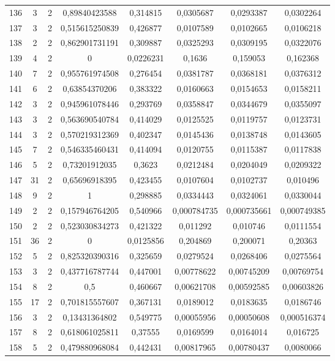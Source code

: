 \begin{longtable}{|c|c|c|c|c|c|c|c|}
136 & 3 & 2 & 0,89840423588 & 0,314815 & 0,0305687 & 0,0293387 & 0,0302264  \\
137 & 3 & 2 & 0,515615250839 & 0,426877 & 0,0107589 & 0,0102665 & 0,0106218  \\
138 & 2 & 2 & 0,862901731191 & 0,309887 & 0,0325293 & 0,0309195 & 0,0322076  \\
139 & 4 & 2 & 0 & 0,0226231 & 0,1636 & 0,159053 & 0,162368  \\
140 & 7 & 2 & 0,955761974508 & 0,276454 & 0,0381787 & 0,0368181 & 0,0376312  \\
141 & 6 & 2 & 0,63854370206 & 0,383322 & 0,0160663 & 0,0154653 & 0,0158211  \\
142 & 3 & 2 & 0,945961078446 & 0,293769 & 0,0358847 & 0,0344679 & 0,0355097  \\
143 & 3 & 2 & 0,563690540784 & 0,414029 & 0,0125525 & 0,0119757 & 0,0123731  \\
144 & 3 & 2 & 0,570219312369 & 0,402347 & 0,0145436 & 0,0138748 & 0,0143605  \\
145 & 7 & 2 & 0,546335460431 & 0,414094 & 0,0120755 & 0,0115387 & 0,0117838  \\
146 & 5 & 2 & 0,73201912035 & 0,3623 & 0,0212484 & 0,0204049 & 0,0209322  \\
147 & 31 & 2 & 0,65696918395 & 0,423455 & 0,0107604 & 0,0102737 & 0,010496  \\
148 & 9 & 2 & 1 & 0,298885 & 0,0334443 & 0,0324061 & 0,0330044  \\
149 & 2 & 2 & 0,157946764205 & 0,540966 & 0,000784735 & 0,000735661 & 0,000749385  \\
150 & 2 & 2 & 0,523030834273 & 0,421322 & 0,011292 & 0,010746 & 0,0111554  \\
151 & 36 & 2 & 0 & 0,0125856 & 0,204869 & 0,200071 & 0,20363  \\
152 & 5 & 2 & 0,825320390316 & 0,325659 & 0,0279524 & 0,0268406 & 0,0275564  \\
153 & 3 & 2 & 0,437716787744 & 0,447001 & 0,00778622 & 0,00745209 & 0,00769754  \\
154 & 8 & 2 & 0,5 & 0,460667 & 0,00621708 & 0,00592585 & 0,00603826  \\
155 & 17 & 2 & 0,701815557607 & 0,367131 & 0,0189012 & 0,0183635 & 0,0186746  \\
156 & 3 & 2 & 0,13431364802 & 0,549775 & 0,00055956 & 0,00050608 & 0,000516374  \\
157 & 8 & 2 & 0,618061025811 & 0,37555 & 0,0169599 & 0,0164014 & 0,016725  \\
158 & 5 & 2 & 0,479880968084 & 0,442431 & 0,00817965 & 0,00780437 & 0,0080066  \\

\end{longtable}
